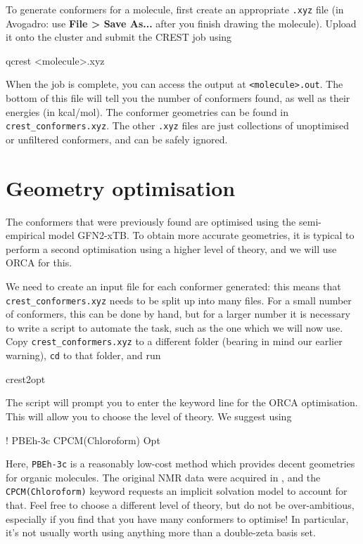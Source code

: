 \documentclass[10pt]{article}
\begin{document}
To generate conformers for a molecule, first create an appropriate \texttt{.xyz} file (in Avogadro: use \textbf{File > Save As...} after you finish drawing the molecule). Upload it onto the cluster and submit the CREST job using

\begin{cmdline}
qcrest <molecule>.xyz
\end{cmdline}

When the job is complete, you can access the output at \texttt{<molecule>.out}. The bottom of this file will tell you the number of conformers found, as well as their energies (in kcal/mol). The conformer geometries can be found in \texttt{crest\_conformers.xyz}. The other \texttt{.xyz} files are just collections of unoptimised or unfiltered conformers, and can be safely ignored.


\section{Geometry optimisation}

The conformers that were previously found are optimised using the semi-empirical model GFN2-xTB.\autocite{Bannwarth2019} To obtain more accurate geometries, it is typical to perform a second optimisation using a higher level of theory, and we will use ORCA for this.

We need to create an input file for each conformer generated: this means that \texttt{crest\_conformers.xyz} needs to be split up into many files. For a small number of conformers, this can be done by hand, but for a larger number it is necessary to write a script to automate the task, such as the one which we will now use. Copy \texttt{crest\_conformers.xyz} to a different folder (bearing in mind our earlier warning), \texttt{cd} to that folder, and run

\begin{cmdline}
crest2opt
\end{cmdline}

The script will prompt you to enter the keyword line for the ORCA optimisation. This will allow you to choose the level of theory. We suggest using 

\begin{cmdline}
! PBEh-3c CPCM(Chloroform) Opt
\end{cmdline}

Here, \texttt{PBEh-3c} is a reasonably low-cost method which provides decent geometries for organic molecules. The original NMR data\autocite{Sun2013} were acquired in , and the \texttt{CPCM(Chloroform)} keyword requests an implicit solvation model to account for that. Feel free to choose a different level of theory, but do not be over-ambitious, especially if you find that you have many conformers to optimise! In particular, it's not usually worth using anything more than a double-zeta basis set.
\end{document}
